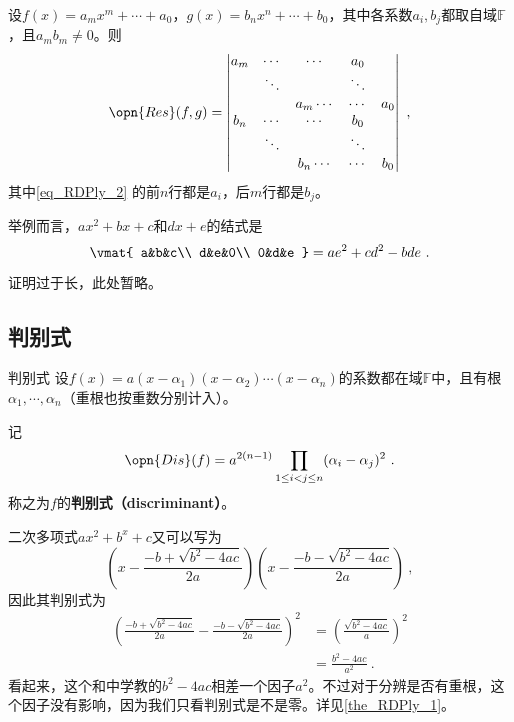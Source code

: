 \begin{theorem}{}\label{the_RDPly_2}
设$f(x)=a_mx^m+\cdots+a_0$，$g(x)=b_nx^n+\cdots+b_0$，其中各系数$a_i, b_j$都取自域$\mathbb{F}$，且$a_mb_m\neq 0$。则
\begin{equation}\label{eq_RDPly_2}
\opn{Res}(f, g)=
\begin{vmatrix}
a_m&\cdots&\cdots&a_0\\
&\ddots& & \ddots\\
&&a_m\cdots&\cdots&a_0\\
b_n&\cdots&\cdots&b_0\\
&\ddots& & \ddots\\
&&b_n\cdots&\cdots&b_0\\
\end{vmatrix}~,
\end{equation}
其中\autoref{eq_RDPly_2} 的前$n$行都是$a_i$，后$m$行都是$b_j$。

举例而言，$ax^2+bx+c$和$dx+e$的结式是
\begin{equation}
\vmat{
    a&b&c\\
    d&e&0\\
    0&d&e
}
=
ae^2+cd^2-bde~.
\end{equation}

\end{theorem}

证明过于长，此处暂略。



\subsection{判别式}

\begin{definition}{判别式}\label{def_RDPly_1}
设$f(x)=a(x-\alpha_1)(x-\alpha_2)\cdots(x-\alpha_n)$的系数都在域$\mathbb{F}$中，且有根$\alpha_1, \cdots, \alpha_n$（重根也按重数分别计入）。

记
\begin{equation}\label{eq_RDPly_3}
\opn{Dis}(f) = a^{2(n-1)}\prod_{1\leq i<j\leq n}(\alpha_i-\alpha_j)^2~.
\end{equation}
称之为$f$的\textbf{判别式（discriminant）}。
\end{definition}

\begin{example}{}
二次多项式$ax^2+b^x+c$又可以写为
\begin{equation}
(x-\frac{-b+\sqrt{b^2-4ac}}{2a})(x-\frac{-b-\sqrt{b^2-4ac}}{2a})~,
\end{equation}
因此其判别式为
\begin{equation}
\begin{aligned}
(\frac{-b+\sqrt{b^2-4ac}}{2a}-\frac{-b-\sqrt{b^2-4ac}}{2a})^2 &= (\frac{\sqrt{b^2-4ac}}{a})^2\\
&=\frac{b^2-4ac}{a^2}~.
\end{aligned}
\end{equation}
看起来，这个和中学教的$b^2-4ac$相差一个因子$a^2$。不过对于分辨是否有重根，这个因子没有影响，因为我们只看判别式是不是零。详见\autoref{the_RDPly_1}。
\end{example}



